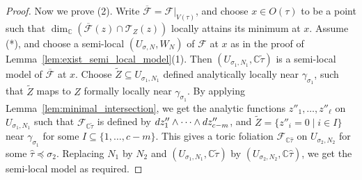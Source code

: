 \documentclass[10pt,a4paper]{amsart}
\newcommand\bC{{\mathbb C}}
\newcommand\cF{{\mathcal{F}}}
\newcommand\cT{{\mathcal{T}}}
\newcommand{\diff}{\textnormal{d}}
\begin{document}
\begin{proof}
    Now we prove (2). 
    Write $\overline\cF=\cF\vert_{V(\tau)}$, and choose $x\in O(\tau)$ to be a point such that $\dim_\bC(\overline\cF(z)\cap \cT_Z(z))$ locally attains its minimum at $x$. Assume (*), and choose a semi-local $(U_{\sigma,N},W_N)$ of $\cF$ at $x$ as in the proof of Lemma~\ref{lem:exist_semi_local_model}(1). Then $(U_{\sigma_1,N_1},\bC\widetilde\tau)$ is a semi-local model of $\overline\cF$ at $x$. Choose $\widetilde Z \subseteq U_{\sigma_1,N_1}$ defined analytically locally near $\gamma_{\sigma_1}$, such that $\widetilde Z$ maps to $Z$ formally locally near $\gamma_{\sigma_1}$. By applying Lemma~\ref{lem:minimal_intersection}, we get the analytic functions $z''_1,\ldots,z''_\ell$ on $U_{\sigma_1,N_1}$ such that $\cF_{\bC \widetilde\tau}$ is defined by $\diff z''_1\wedge\cdots\wedge\diff z''_{c-m}$, and $\widetilde Z=\{z''_i=0\mid i\in I\}$ near $\gamma_{\sigma_1}$ for some $I\subseteq\{1,\ldots,c-m\}$. This gives a toric foliation $\cF_{\bC\widehat\tau}$ on $U_{\sigma_2,N_2}$ for some $\widehat\tau\preceq\sigma_2$. Replacing $N_1$ by $N_2$ and  $(U_{\sigma_1,N_1},\bC\widetilde\tau)$ by $(U_{\sigma_2,N_2},\bC\widehat\tau)$, we get the semi-local model as required.
\end{proof}
\end{document}
